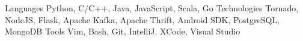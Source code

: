 \begin{cvskills}
  \cvskill
    {Languages}
    {Python, C/C++, Java, JavaScript, Scala, Go}
  \cvskill
    {Technologies}
    {Tornado, NodeJS, Flask, Apache Kafka, Apache Thrift, Android SDK, PostgreSQL, MongoDB}
  \cvskill
    {Tools}
    {Vim, Bash, Git, IntelliJ, XCode, Visual Studio}
\end{cvskills}
